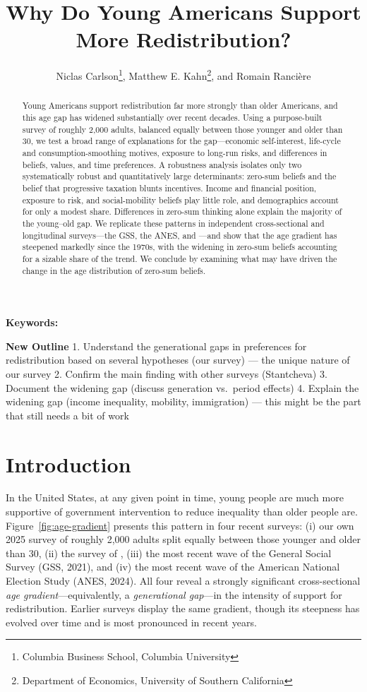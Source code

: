 \documentclass[11pt, headsepline]{article}
\title{Why Do Young Americans Support More Redistribution?}
\author{Niclas Carlson\thanks{Columbia Business School, Columbia University}, Matthew E. Kahn\thanks{Department of Economics, University of Southern California}, and Romain Rancière\footnotemark[2]}
\begin{document}
\maketitle
\begin{abstract}
Young Americans support redistribution far more strongly than older Americans, and this age gap has widened substantially over recent decades. Using a purpose-built survey of roughly 2{,}000 adults, balanced equally between those younger and older than 30, we test a broad range of explanations for the gap---economic self-interest, life-cycle and consumption-smoothing motives, exposure to long-run risks, and differences in beliefs, values, and time preferences. A robustness analysis isolates only two systematically robust and quantitatively large determinants: zero-sum beliefs and the belief that progressive taxation blunts incentives. Income and financial position, exposure to risk, and social-mobility beliefs play little role, and demographics account for only a modest share. Differences in zero-sum thinking alone explain the majority of the young--old gap. We replicate these patterns in independent cross-sectional and longitudinal surveys---the GSS, the ANES, and \citet{chinoy2026zero}---and show that the age gradient has steepened markedly since the 1970s, with the widening in zero-sum beliefs accounting for a sizable share of the trend. We conclude by examining what may have driven the change in the age distribution of zero-sum beliefs.
\end{abstract}

\noindent\textbf{Keywords:}

\newpage

\textbf{New Outline }
1. Understand the generational gaps in preferences for redistribution based on several hypotheses (our survey) --- the unique nature of our survey
2. Confirm the main finding with other surveys (Stantcheva)
3. Document the widening gap (discuss generation vs.\ period effects)
4. Explain the widening gap (income inequality, mobility, immigration) --- this might be the part that still needs a bit of work


\section{Introduction}

In the United States, at any given point in time, young people are much more supportive of government intervention to reduce inequality than older people are. Figure~\ref{fig:age-gradient} presents this pattern in four recent surveys: (i) our own 2025 survey of roughly 2{,}000 adults split equally between those younger and older than 30, (ii) the survey of \citet{chinoy2026zero}, (iii) the most recent wave of the General Social Survey (GSS, 2021), and (iv) the most recent wave of the American National Election Study (ANES, 2024). All four reveal a strongly significant cross-sectional \textit{age gradient}---equivalently, a \textit{generational gap}---in the intensity of support for redistribution. Earlier surveys display the same gradient, though its steepness has evolved over time and is most pronounced in recent years.
\end{document}
